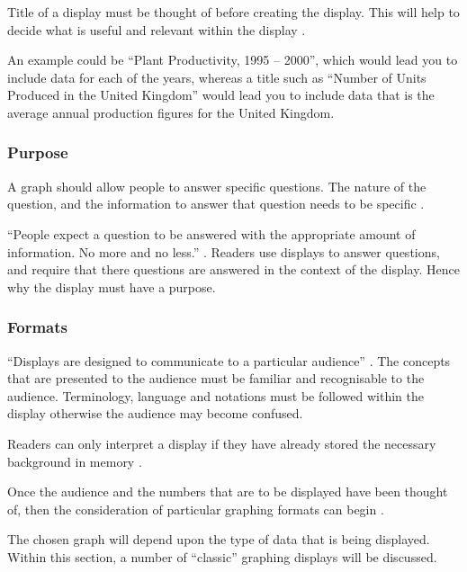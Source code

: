Title of a display must be thought of before creating the display. This will 
help to decide what is useful and relevant within the display \citep{kosslyn06}.

An example could be ``Plant Productivity, 1995 -- 2000'', which would lead you 
to include data for each of the years, whereas a title such as ``Number of 
Units Produced in the United Kingdom'' would lead you to include data that is 
the average annual production figures for the United Kingdom.


\subsubsection*{Purpose}
A graph should allow people to answer specific questions. The nature of the 
question, and the information to answer that question needs to be specific 
\citep{kosslyn06}.

``People expect a question to be answered with the appropriate amount of 
information. No more and no less.'' \citep{grice75}. Readers use displays to 
answer questions, and require that there questions are answered in the context 
of the display. Hence why the display must have a purpose.


\subsubsection*{Formats}
``Displays are designed to communicate to a particular audience'' 
\citep{kosslyn06}. The concepts that are presented to the audience must be 
familiar and recognisable to the audience. Terminology, language and notations
must be followed within the display otherwise the audience may become confused.

Readers can only interpret a display if they have already stored the necessary
background in memory \citep{kosslyn06}.

Once the audience and the numbers that are to be displayed have been thought 
of, then the consideration of particular graphing formats can begin 
\citep{kosslyn06}. 

The chosen graph will depend upon the type of data that is being displayed. 
Within this section, a number of ``classic'' graphing displays will be 
discussed.
